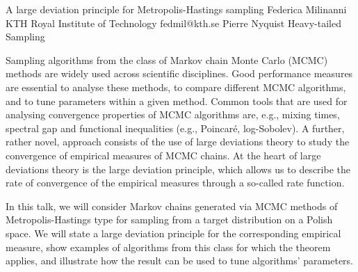 \begin{talk}
  {A large deviation principle for Metropolis-Hastings sampling}%
  {Federica Milinanni}%
  {KTH Royal Institute of Technology}%
  {fedmil@kth.se}%
  {Pierre Nyquist}%
  {Heavy-tailed Sampling}%
    
   
   
Sampling algorithms from the class of Markov chain Monte Carlo (MCMC) methods are widely used across scientific disciplines. Good performance measures are essential to analyse these methods, to compare different MCMC algorithms, and to tune parameters within a given method. Common tools that are used for analysing convergence properties of MCMC algorithms are, e.g., mixing times, spectral gap and functional inequalities (e.g., Poincar\'e, log-Sobolev). A further, rather novel, approach consists of the use of large deviations theory to study the convergence of empirical measures of MCMC chains. At the heart of large deviations theory is the large deviation principle, which allows us to describe the rate of convergence of the empirical measures through a so-called rate function.

In this talk, we will consider Markov chains generated via MCMC methods of Metropolis-Hastings type for sampling from a target distribution on a Polish space. We will state a large deviation principle for the corresponding empirical measure, show examples of algorithms from this class for which the theorem applies, and illustrate how the result can be used to tune algorithms' parameters.

\medskip

\end{talk}

